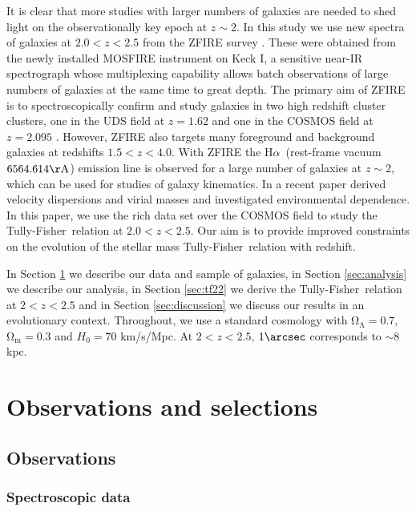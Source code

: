 \documentclass{emulateapj}
\newcommand{\ha}{H$\alpha$}
\newcommand{\tf}{Tully-Fisher}
\begin{document}
It is clear that more studies with larger numbers of galaxies are needed to shed light on the observationally key epoch at $z\sim2$. In this study we use new spectra of galaxies at $2.0<z<2.5$ from the ZFIRE survey \citep{Nanayakkara16}. These were obtained from the newly installed MOSFIRE instrument on Keck I, a sensitive near-IR spectrograph {whose multiplexing capability} allows batch observations of large numbers of galaxies at the same time {to great depth}. The primary aim of ZFIRE is to spectroscopically confirm and study galaxies in two high redshift cluster clusters, one in the UDS field \citep{Lawrence07} at $z=1.62$ \citep{Papovich10} and one in the COSMOS field \citep{Scoville07} at $z=2.095$ \citep{Spitler12,Yuan14}. However, ZFIRE also targets many foreground and background galaxies at redshifts $1.5<z< 4.0$. {With ZFIRE the \ha\ (rest-frame vacuum $6564.614\mathrm{\AA}$) emission line is observed for a large number of galaxies at $z\sim2$, which can be used for studies of galaxy kinematics. In a recent paper \citet{Alcorn16} derived velocity dispersions and virial masses and investigated environmental dependence.} In this paper, we use the rich data set over the COSMOS field to study the \tf\ relation at $2.0 < z < 2.5$. Our aim is to provide improved constraints on the evolution of the stellar mass \tf\ relation with redshift.

In Section \ref{sec:data} we describe our data and sample of galaxies, in Section \ref{sec:analysis} we describe our analysis, in Section \ref{sec:tf22} we derive the \tf\ relation at $2<z<2.5$ and in Section \ref{sec:discussion} we discuss our results in an evolutionary context. Throughout, we use a standard cosmology with $\mathrm{\Omega_{\Lambda}=0.7}$, $\mathrm{\Omega_{m}=0.3}$ and $H_0=70$ km/s/Mpc. At {$2<z<2.5$}, {$1\arcsec$} corresponds to {$\sim 8$} kpc.


\section{Observations and selections}
\label{sec:data}

\subsection{Observations}

\subsubsection{Spectroscopic data}
\end{document}
